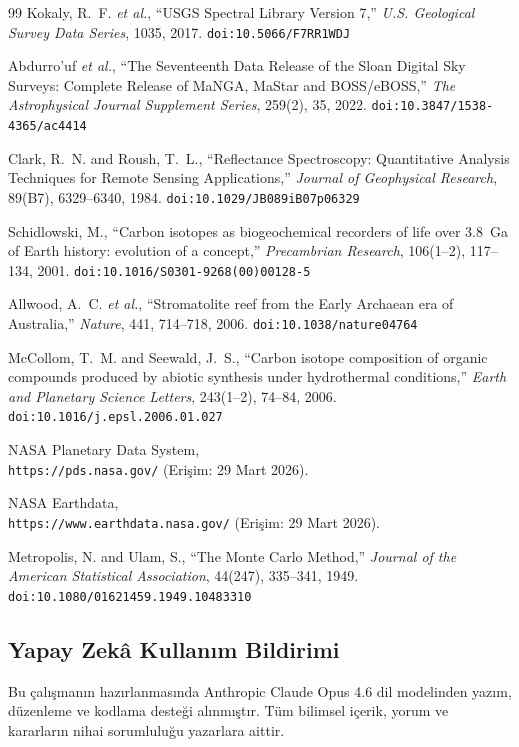 \documentclass[12pt,a4paper]{article}
\begin{document}
\begin{thebibliography}{99}
Kokaly, R.~F. \textit{et al.},
``USGS Spectral Library Version 7,''
\textit{U.S. Geological Survey Data Series}, 1035, 2017.
\texttt{doi:10.5066/F7RR1WDJ}

Abdurro'uf \textit{et al.},
``The Seventeenth Data Release of the Sloan Digital Sky Surveys: Complete Release of MaNGA, MaStar and BOSS/eBOSS,''
\textit{The Astrophysical Journal Supplement Series}, 259(2), 35, 2022.
\texttt{doi:10.3847/1538-4365/ac4414}

Clark, R.~N. and Roush, T.~L.,
``Reflectance Spectroscopy: Quantitative Analysis Techniques for Remote Sensing Applications,''
\textit{Journal of Geophysical Research}, 89(B7), 6329--6340, 1984.
\texttt{doi:10.1029/JB089iB07p06329}

Schidlowski, M.,
``Carbon isotopes as biogeochemical recorders of life over 3.8~Ga of Earth history: evolution of a concept,''
\textit{Precambrian Research}, 106(1--2), 117--134, 2001.
\texttt{doi:10.1016/S0301-9268(00)00128-5}

Allwood, A.~C. \textit{et al.},
``Stromatolite reef from the Early Archaean era of Australia,''
\textit{Nature}, 441, 714--718, 2006.
\texttt{doi:10.1038/nature04764}

McCollom, T.~M. and Seewald, J.~S.,
``Carbon isotope composition of organic compounds produced by abiotic synthesis under hydrothermal conditions,''
\textit{Earth and Planetary Science Letters}, 243(1--2), 74--84, 2006.
\texttt{doi:10.1016/j.epsl.2006.01.027}

NASA Planetary Data System,
\\\texttt{https://pds.nasa.gov/}
(Erişim: 29 Mart 2026).

NASA Earthdata,
\\\texttt{https://www.earthdata.nasa.gov/}
(Erişim: 29 Mart 2026).

Metropolis, N. and Ulam, S.,
``The Monte Carlo Method,''
\textit{Journal of the American Statistical Association}, 44(247), 335--341, 1949.
\texttt{doi:10.1080/01621459.1949.10483310}

\end{thebibliography}

\subsection*{Yapay Zekâ Kullanım Bildirimi}
Bu çalışmanın hazırlanmasında Anthropic Claude Opus 4.6 dil modelinden yazım, düzenleme ve kodlama desteği alınmıştır. Tüm bilimsel içerik, yorum ve kararların nihai sorumluluğu yazarlara aittir.
\end{document}
